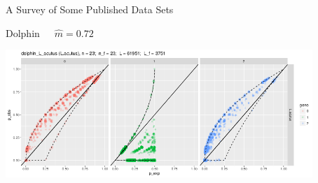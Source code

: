\documentclass[letter,graphicx]{beamer}
\begin{document}
\begin{frame}{A Survey of Some Published Data Sets}

\begin{center}
Dolphin~~~$\hat{m} = 0.72$
\vspace*{1.5em}

\includegraphics[width=0.87\textwidth]{./images/dolphin_L_acutus_big_pop.png}
\end{center}
\end{frame}
\end{document}
